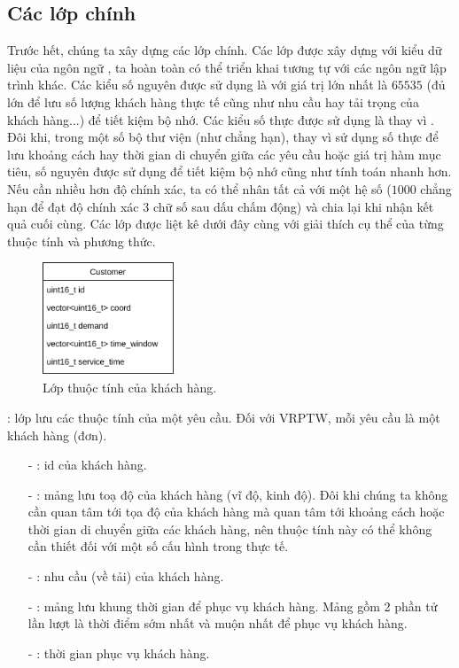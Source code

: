 \subsection{Các lớp chính}
\label{sec:core-objects}
Trước hết, chúng ta xây dựng các lớp chính. Các lớp được xây dựng với kiểu dữ liệu của ngôn ngữ , ta hoàn toàn có thể triển khai tương tự với các ngôn ngữ lập trình khác. Các kiểu số nguyên được sử dụng là  với giá trị lớn nhất là $65535$ (đủ lớn để lưu số lượng khách hàng thực tế cũng như nhu cầu hay tải trọng của khách hàng...) để tiết kiệm bộ nhớ. Các kiểu số thực được sử dụng là  thay vì . Đôi khi, trong một số bộ thư viện (như  chẳng hạn), thay vì sử dụng số thực để lưu khoảng cách hay thời gian di chuyển giữa các yêu cầu hoặc giá trị hàm mục tiêu, số nguyên được sử dụng để tiết kiệm bộ nhớ cũng như tính toán nhanh hơn. Nếu cần nhiều hơn độ chính xác, ta có thể nhân tất cả với một hệ số ($1000$ chẳng hạn để đạt độ chính xác $3$ chữ số sau dấu chấm động) và chia lại khi nhận kết quả cuối cùng. Các lớp được liệt kê dưới đây cùng với giải thích cụ thể của từng thuộc tính và phương thức.

\begin{figure}[H] %
	\centering %
	\includegraphics[width=0.35\textwidth]{figures/Customer.png}
	\caption{Lớp thuộc tính của khách hàng.}
	\label{fig:fg_02}
\end{figure}

: lớp lưu các thuộc tính của một yêu cầu. Đối với VRPTW, mỗi yêu cầu là một khách hàng (đơn).

\begin{itemize}
	\item[-] : id của khách hàng.
	\item[-] : mảng lưu toạ độ của khách hàng (vĩ độ, kinh độ). Đôi khi chúng ta không cần quan tâm tới tọa độ của khách hàng mà quan tâm tới khoảng cách hoặc thời gian di chuyển giữa các khách hàng, nên thuộc tính này có thể không cần thiết đối với một số cấu hình trong thực tế.
	\item[-] : nhu cầu (về tải) của khách hàng.
	\item[-] : mảng lưu khung thời gian để phục vụ khách hàng. Mảng gồm 2 phần tử lần lượt là thời điểm sớm nhất và muộn nhất để phục vụ khách hàng.
	\item[-] : thời gian phục vụ khách hàng.
\end{itemize}


